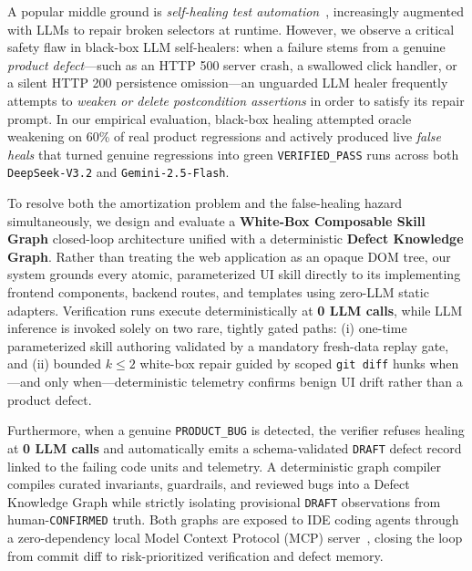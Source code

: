 \documentclass[conference]{IEEEtran}
\begin{document}
A popular middle ground is \emph{self-healing test automation}~\cite{choudhary2011water,stocco2018vista}, increasingly augmented with LLMs to repair broken selectors at runtime. However, we observe a critical safety flaw in black-box LLM self-healers: when a failure stems from a genuine \emph{product defect}---such as an HTTP 500 server crash, a swallowed click handler, or a silent HTTP 200 persistence omission---an unguarded LLM healer frequently attempts to \emph{weaken or delete postcondition assertions} in order to satisfy its repair prompt. In our empirical evaluation, black-box healing attempted oracle weakening on 60\% of real product regressions and actively produced live \emph{false heals} that turned genuine regressions into green \texttt{VERIFIED\_PASS} runs across both \texttt{DeepSeek-V3.2} and \texttt{Gemini-2.5-Flash}.

To resolve both the amortization problem and the false-healing hazard simultaneously, we design and evaluate a \textbf{White-Box Composable Skill Graph} closed-loop architecture unified with a deterministic \textbf{Defect Knowledge Graph}. Rather than treating the web application as an opaque DOM tree, our system grounds every atomic, parameterized UI skill directly to its implementing frontend components, backend routes, and templates using zero-LLM static adapters. Verification runs execute deterministically at \textbf{0 LLM calls}, while LLM inference is invoked solely on two rare, tightly gated paths: (i) one-time parameterized skill authoring validated by a mandatory fresh-data replay gate, and (ii) bounded $k \le 2$ white-box repair guided by scoped \texttt{git diff} hunks when---and only when---deterministic telemetry confirms benign UI drift rather than a product defect.

Furthermore, when a genuine \texttt{PRODUCT\_BUG} is detected, the verifier refuses healing at \textbf{0 LLM calls} and automatically emits a schema-validated \texttt{DRAFT} defect record linked to the failing code units and telemetry. A deterministic graph compiler compiles curated invariants, guardrails, and reviewed bugs into a Defect Knowledge Graph while strictly isolating provisional \texttt{DRAFT} observations from human-\texttt{CONFIRMED} truth. Both graphs are exposed to IDE coding agents through a zero-dependency local Model Context Protocol (MCP) server~\cite{mcp2024}, closing the loop from commit diff to risk-prioritized verification and defect memory.
\end{document}
